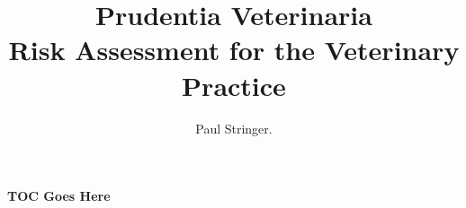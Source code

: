 \documentclass[oneside]{book}
\begin{document}


\title{
  {\Huge\bfseries Prudentia Veterinaria} \\[10pt]
  {\Large Risk Assessment for the Veterinary Practice}
}
\author{Paul Stringer.}
\date{}
\maketitle

\paragraph{TOC Goes Here}
\newpage











































\end{document}
